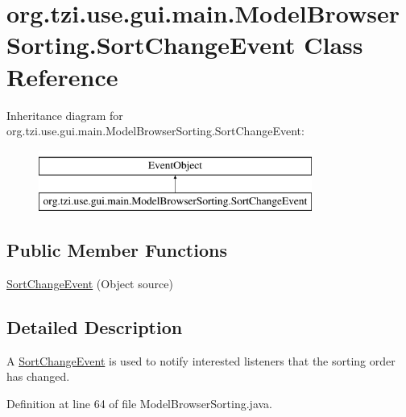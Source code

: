 \hypertarget{classorg_1_1tzi_1_1use_1_1gui_1_1main_1_1_model_browser_sorting_1_1_sort_change_event}{\section{org.\-tzi.\-use.\-gui.\-main.\-Model\-Browser\-Sorting.\-Sort\-Change\-Event Class Reference}
\label{classorg_1_1tzi_1_1use_1_1gui_1_1main_1_1_model_browser_sorting_1_1_sort_change_event}
}
Inheritance diagram for org.\-tzi.\-use.\-gui.\-main.\-Model\-Browser\-Sorting.\-Sort\-Change\-Event\-:\begin{figure}[H]
\begin{center}
\leavevmode
\includegraphics[height=2.000000cm]{classorg_1_1tzi_1_1use_1_1gui_1_1main_1_1_model_browser_sorting_1_1_sort_change_event}
\end{center}
\end{figure}
\subsection*{Public Member Functions}
\begin{DoxyCompactItemize}
\item 
\hyperlink{classorg_1_1tzi_1_1use_1_1gui_1_1main_1_1_model_browser_sorting_1_1_sort_change_event_afb81d495f701dddc9c2692d75978c357}{Sort\-Change\-Event} (Object source)
\end{DoxyCompactItemize}


\subsection{Detailed Description}
A \hyperlink{classorg_1_1tzi_1_1use_1_1gui_1_1main_1_1_model_browser_sorting_1_1_sort_change_event}{Sort\-Change\-Event} is used to notify interested listeners that the sorting order has changed. 

Definition at line 64 of file Model\-Browser\-Sorting.\-java.



